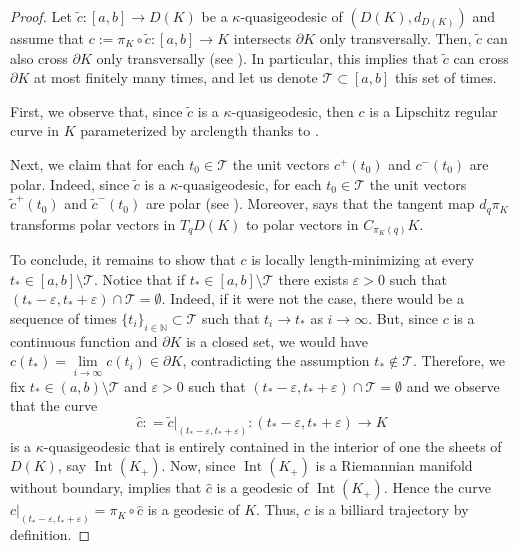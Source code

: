 \documentclass[11pt]{article}
\theoremstyle{definition}
\theoremstyle{remark}
\theoremstyle{plain}
\DeclareMathOperator{\Int}{Int}
\newcommand{\N}{\mathbb{N}}
\begin{document}
\begin{proof}

Let $\tilde c:[a,b]\to D(K)$ be a $\kappa$-quasigeodesic of $(D(K),d_{D(K)})$ and assume that $c:=\pi_K\circ \tilde c:[a,b]\to K$ intersects $\partial K$ only transversally. Then, $\tilde c$ can also cross $\partial K$ only transversally (see ). In particular, this implies that $\tilde c$ can cross $\partial K$ at most finitely many times, and let us denote $\mathcal{T}\subset [a,b]$ this set of times.

First, we observe that, since $\tilde c$ is a $\kappa$-quasigeodesic, then $c$ is a Lipschitz regular curve in $K$ parameterized by arclength thanks to .

Next, we claim that for each $t_0\in \mathcal{T}$ the unit vectors $c^+(t_0)$ and $c^-(t_0)$ are polar. Indeed, since $\tilde c$ is a $\kappa$-quasigeodesic, for each $t_0\in \mathcal{T}$ the unit vectors $\tilde c^+(t_0)$ and $\tilde c^-(t_0)$ are polar (see ). Moreover,  says that the tangent map $d_q\pi_K$ transforms polar vectors in $T_qD(K)$ to polar vectors in $C_{\pi_K(q)}K$.

To conclude, it remains to show that $c$ is locally length-minimizing at every $t_*\in [a,b]\setminus \mathcal{T}$. Notice that if $t_*\in [a,b]\setminus\mathcal{T}$ there exists $\varepsilon>0$ such that $(t_*-\varepsilon,t_*+\varepsilon)\cap \mathcal{T} =\emptyset$. Indeed, if it were not the case, there would be a sequence of times $\{t_i\}_{i\in \N}\subset\mathcal{T}$ such that $t_i\rightarrow t_*$ as $i\rightarrow \infty$. But, since $c$ is a continuous function and $\partial K$ is a closed set, we would have $c(t_*) = \lim\limits_{i \rightarrow \infty}c(t_i)\in \partial K$, contradicting the assumption $t_*\notin \mathcal{T}$. Therefore, we fix $t_*\in (a,b)\setminus\mathcal{T}$ and $\varepsilon>0$ such that $(t_*-\varepsilon,t_*+\varepsilon)\cap \mathcal{T} =\emptyset$ and we observe that the curve 
$$\hat{c}: = \tilde c\big|_{(t_*-\varepsilon,t_*+\varepsilon)} : (t_*-\varepsilon,t_*+\varepsilon)\rightarrow K$$
is a $\kappa$-quasigeodesic that is entirely contained in the interior of one the sheets of $D(K)$, say $\Int(K_+)$. Now, since $\Int(K_+)$ is a Riemannian manifold without boundary,  implies that $\hat{c}$ is a geodesic of $\Int(K_+)$. Hence the curve $c|_{(t_*-\varepsilon,t_*+\varepsilon)} = \pi_K\circ \hat c$ is a geodesic of $K$. Thus, $c$ is a billiard trajectory by definition.

\end{proof}
\end{document}
